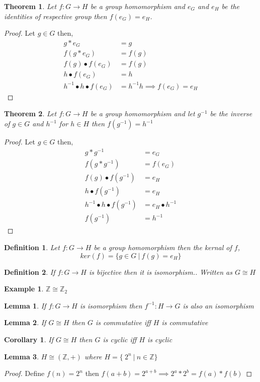 \documentclass[12pt,a4paper]{article}
\newcommand{\Z}{\mathbb{Z}}
\newtheorem{thm}{Theorem}
\newtheorem*{defn}{Definition}
\newtheorem*{lem}{Lemma}
\newtheorem*{cor}{Corollary}
\newtheorem{ex}{Example}
\begin{document}
\begin{thm}
	Let $f: G \to H$ be a group homomorphism and $e_{G}$ and $e_{H}$ be the identities of respective group then $f(e_{G}) = e_{H}$.
\end{thm}
\begin{proof}
	Let $g \in G$ then,
	\begin{align*}
		g*e_{G} &= g \\
		f(g*e_{G}) &= f(g) \\
		f(g)\bullet f(e_{G}) &= f(g) \\
		h \bullet f(e_{G}) &= h \\
		h^{-1} \bullet h \bullet f(e_{G}) &= h^{-1}h \implies f(e_{G}) = e_{H}
	\end{align*}
\end{proof}


\begin{thm}
	Let $f: G \to H$ be a group homomorphism and let $g^{-1}$ be the inverse of $g \in G$ and $h^{-1}$ for $h \in H$ then $f(g^{-1}) = h^{-1}$
\end{thm}
\begin{proof}
	Let $g \in G$ then, 
	\begin{align*}
		g*g^{-1} & = e_{G} \\
		f(g*g^{-1}) & = f(e_{G}) \\
		f(g)\bullet f(g^{-1}) & = e_{H} \\
		h\bullet f(g^{-1}) & = e_{H} \\
		h^{-1}\bullet h\bullet f(g^{-1}) & = e_{H} \bullet h^{-1} \\
		f(g^{-1}) & =  h^{-1}
	\end{align*}
\end{proof}

\begin{defn} \normalfont
	Let $f: G \to H$ be a group homomorphism then the kernal of $f$,
	\[
		ker(f) = \{g\in G \:| \: f(g)=e_{H}\}
	\]
\end{defn}

\begin{defn}
\normalfont	If $f: G \to H$ is bijective then it is \textit{isomorphism.}. Written as $G \cong H$
\end{defn}
\begin{ex}
	$\Z \cong \Z_{2}$
\end{ex}
\begin{lem}
	\normalfont If $f: G \to H$ is isomorphism then $f^{-1}: H \to G$ is also an isomorphism
\end{lem}
\begin{lem}
	\normalfont If $G \cong H$ then $G$ is commutative iff $H$ is commutative
\end{lem}
\begin{cor}
	\normalfont If $G \cong H$ then $G$ is cyclic iff $H$ is cyclic
\end{cor}
\begin{lem}
	\normalfont $H \cong (\Z, +)$ where $H =  \{\ 2^n \: | \: n \in \Z \}$
\end{lem}
\begin{proof}
	Define $f(n) = 2^n$ then $f(a+b) = 2^{a+b} \implies 2^a * 2^b = f(a)*f(b)$
\end{proof}
\end{document}
